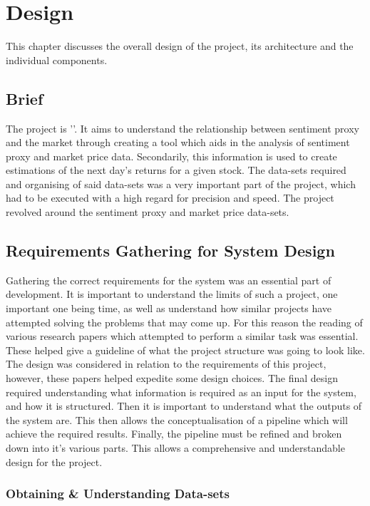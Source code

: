 
\chapter{Design}

This chapter discusses the overall design of the project, its architecture and the individual components.

\section{Brief}

The project is '\thesistitle'. It aims to understand the relationship between sentiment proxy and the market through creating a tool which aids in the analysis of sentiment proxy and market price data. Secondarily, this information is used to create estimations of the next day's returns for a given stock. The data-sets required and organising of said data-sets was a very important part of the project, which had to be executed with a high regard for precision and speed. The project revolved around the sentiment proxy and market price data-sets.

\section{Requirements Gathering for System Design}

Gathering the correct requirements for the system was an essential part of development. It is important to understand the limits of such a project, one important one being time, as well as understand how similar projects have attempted solving the problems that may come up. For this reason the reading of various research papers which attempted to perform a similar task was essential. These helped give a guideline of what the project structure was going to look like. The design was considered in relation to the requirements of this project, however, these papers helped expedite some design choices. The final design required understanding what information is required as an input for the system, and how it is structured. Then it is important to understand what the outputs of the system are. This then allows the conceptualisation of a pipeline which will achieve the required results. Finally, the pipeline must be refined and broken down into it's various parts. This allows a comprehensive and understandable design for the project.

\subsection{Obtaining \& Understanding Data-sets}

